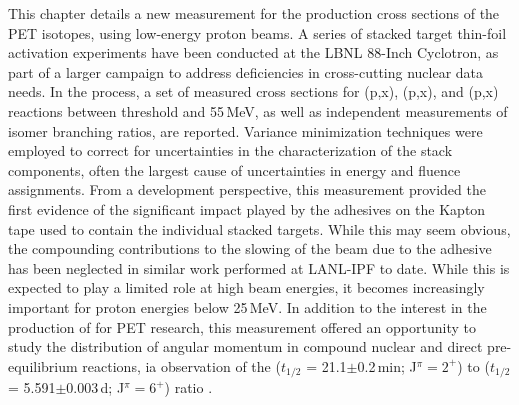 This chapter details a new measurement for the production cross sections of the  PET isotopes, using low-energy proton beams.
A series of stacked target thin-foil activation experiments have been conducted at the LBNL 88-Inch Cyclotron, as part of a larger campaign to address deficiencies in cross-cutting nuclear data needs.  
In the process, a set of  measured  cross sections for  (p,x), (p,x), and  (p,x) reactions between threshold and 55\,MeV, as well as  independent measurements of isomer branching ratios, are reported. 
Variance minimization techniques were employed  to correct for uncertainties in  the characterization of the stack components, often the largest cause of uncertainties in energy and  fluence assignments.
From a development perspective, this measurement provided the first evidence of the significant impact  played by the adhesives on the Kapton tape used to contain the individual stacked targets. 
While this may seem obvious, the compounding contributions to the slowing of the beam due to the adhesive has been neglected in similar work performed at LANL-IPF to date. 
While this is expected to play a limited role at high beam energies, it becomes increasingly important for proton energies below 25\,MeV.
In addition to the interest in the production of  for PET research, this measurement  offered an opportunity to study the distribution of angular momentum in compound nuclear and direct pre-equilibrium reactions, ia observation of the  ($t_{1/2}$ = 21.1$\pm$0.2\,min; J$^\pi=2^+$) to  ($t_{1/2}$ = 5.591$\pm$0.003\,d; J$^\pi=6^+$)   ratio \cite{Dong2015,Wang2017}.






